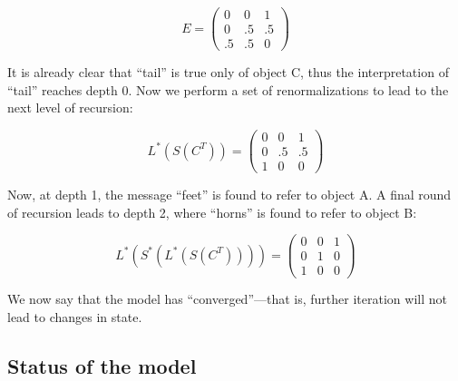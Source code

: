 \begin{equation}
E = \left(
    \begin{array}{ccc}
      0 & 0 & 1 \\
      0 & .5 & .5\\
      .5 & .5 & 0 
    \end{array} 
  \right)
\end{equation}

It is already clear that ``tail'' is true only of object C, thus the interpretation of ``tail'' reaches depth 0. Now we perform a set of renormalizations to lead to the next level of recursion:

\begin{equation}
L^*(S(C^T)) = \left(
    \begin{array}{ccc}
      0 & 0 & 1 \\
      0 & .5 & .5\\
      1 & 0 & 0 
    \end{array} 
  \right)
\end{equation}

Now, at depth 1, the message ``feet'' is found to refer to object A. A final round of recursion leads to depth 2, where ``horns'' is found to refer to object B:

\begin{equation}
L^*(S^*(L^*(S(C^T)))) = \left(
    \begin{array}{ccc}
      0 & 0 & 1 \\
      0 & 1 & 0\\
      1 & 0 & 0 
    \end{array} 
  \right)
\end{equation}

We now say that the model has ``converged''---that is, further iteration will not lead to changes in state.

\subsection{Status of the model}

